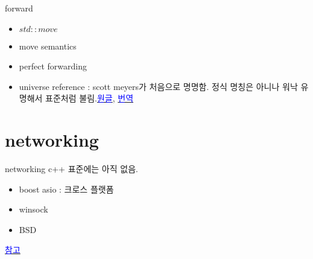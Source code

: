 \documentclass[10pt]{beamer}
\begin{document}
\begin{frame}{forward}
    \begin{itemize}
        \item $std::move$
        \item move semantics
        \item perfect forwarding
        \item universe reference : scott meyers가 처음으로 명명함. 정식 명칭은 아니나 워낙 유명해서 표준처럼 불림.\href{https://isocpp.org/blog/2012/11/universal-references-in-c11-scott-meyers}{\textcolor{blue}{원글}}, \href{http://egloos.zum.com/sweeper/v/3149089}{\textcolor{blue}{번역}}
        
    \end{itemize}
\end{frame}





\section{networking}


\begin{frame}{networking}
    c++ 표준에는 아직 없음.
    \begin{itemize}
        \item boost asio : 크로스 플랫폼
        \item winsock
        \item BSD
    \end{itemize}
    
    \href{https://jacking.tistory.com/1267}{\textcolor{blue}{참고}}
    
\end{frame}


    









\end{document}
